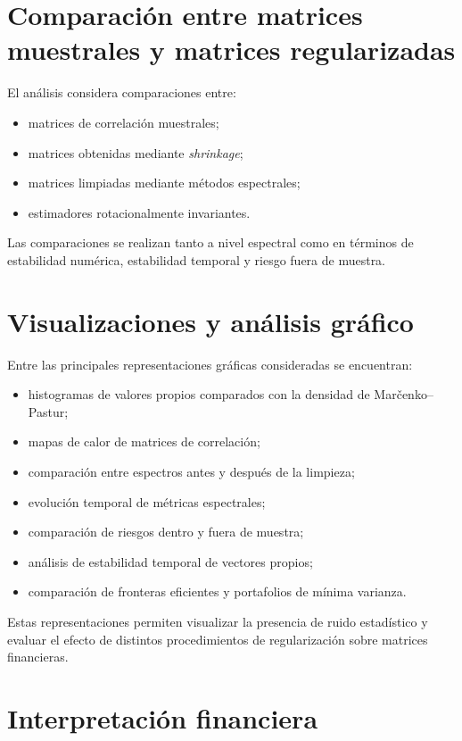 \documentclass[letterpaper,12pt,oneside]{book}
\begin{document}
\section{Comparación entre matrices muestrales y matrices regularizadas}

El análisis considera comparaciones entre:

\begin{itemize}
\item matrices de correlación muestrales;
\item matrices obtenidas mediante \textit{shrinkage};
\item matrices limpiadas mediante métodos espectrales;
\item estimadores rotacionalmente invariantes.
\end{itemize}

Las comparaciones se realizan tanto a nivel espectral como en términos de estabilidad numérica, estabilidad temporal y riesgo fuera de muestra.

\section{Visualizaciones y análisis gráfico}

Entre las principales representaciones gráficas consideradas se encuentran:

\begin{itemize}
\item histogramas de valores propios comparados con la densidad de Marčenko--Pastur;
\item mapas de calor de matrices de correlación;
\item comparación entre espectros antes y después de la limpieza;
\item evolución temporal de métricas espectrales;
\item comparación de riesgos dentro y fuera de muestra;
\item análisis de estabilidad temporal de vectores propios;
\item comparación de fronteras eficientes y portafolios de mínima varianza.
\end{itemize}

Estas representaciones permiten visualizar la presencia de ruido estadístico y evaluar el efecto de distintos procedimientos de regularización sobre matrices financieras.

\section{Interpretación financiera}
\end{document}
